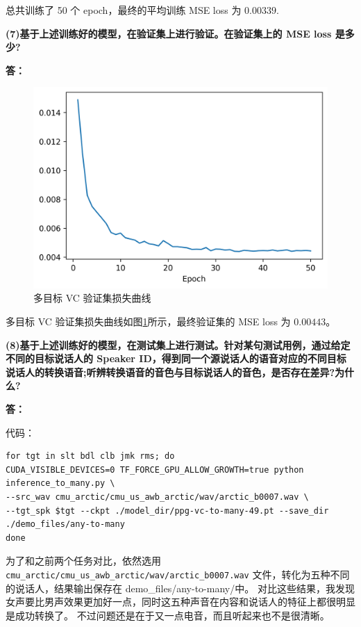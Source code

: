 \documentclass[degree=project,degree-type=project,cjk-font=noto]{thuthesis}
\begin{document}
总共训练了 50 个 epoch，最终的平均训练 MSE loss 为 $0.00339$.

\textbf{(7)基于上述训练好的模型，在验证集上进行验证。在验证集上的 MSE loss 是多少?}

\textbf{答：}

\begin{figure}[h]
\centering%
\includegraphics[width=.75\linewidth]{val_task4.png}
  \caption{多目标 VC 验证集损失曲线}
  \label{fig:val_task4}
\end{figure}

多目标 VC 验证集损失曲线如图\ref{fig:val_task4}所示，最终验证集的 MSE loss 为 $0.00443$。

\textbf{(8)基于上述训练好的模型，在测试集上进行测试。针对某句测试用例，通过给定不同的目标说话人的 Speaker ID，得到同一个源说话人的语音对应的不同目标说话人的转换语音;听辨转换语音的音色与目标说话人的音色，是否存在差异?为什么?}

\textbf{答：}

代码：

  \begin{verbatim}
for tgt in slt bdl clb jmk rms; do 
CUDA_VISIBLE_DEVICES=0 TF_FORCE_GPU_ALLOW_GROWTH=true python inference_to_many.py \
--src_wav cmu_arctic/cmu_us_awb_arctic/wav/arctic_b0007.wav \
--tgt_spk $tgt --ckpt ./model_dir/ppg-vc-to-many-49.pt --save_dir ./demo_files/any-to-many
done
\end{verbatim}

为了和之前两个任务对比，依然选用 \texttt{cmu\_arctic/cmu\_us\_awb\_arctic/wav/arctic\_b0007.wav} 文件，转化为五种不同的说话人，结果输出保存在 demo\_files/any-to-many/中。
对比这些结果，我发现女声要比男声效果更加好一点，同时这五种声音在内容和说话人的特征上都很明显是成功转换了。
不过问题还是在于又一点电音，而且听起来也不是很清晰。
\end{document}
